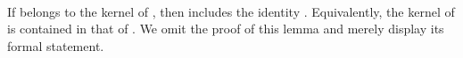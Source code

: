 \begin{itemize}
\begin{code}
\AgdaSpace{}%
\AgdaOperator{\AgdaFunction{]}}\AgdaSpace{}%
\AgdaSpace{}%
\AgdaSymbol{(}\AgdaSpace{}%
\AgdaSpace{}%
\AgdaOperator{\AgdaFunction{epiF[}}\AgdaSpace{}%
\AgdaSpace{}%
\AgdaOperator{\AgdaFunction{]}}\AgdaSpace{}%
\AgdaSymbol{)}\AgdaSpace{}%
\<%
\\
\>[0]\<%
\end{code}
If  belongs to the kernel of , then
  includes the identity   .
Equivalently,
the kernel of  is contained in that of .
\ifshort
We omit the proof of this lemma and merely display its formal statement.
\else
\fi


\end{itemize}
